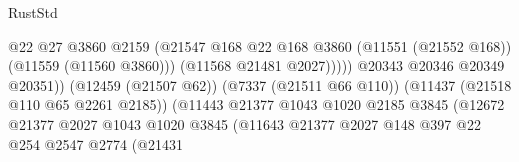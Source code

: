 \begin{lexlean}{RustStd}
\begin{coremodule}
                                                            @22
                                                            @27
                                                            @3860
                                                            @2159
                                                            (@21547
                                                              @168
                                                              @22
                                                              @168
                                                              @3860
                                                              (@11551 (@21552 @168))
                                                              (@11559 (@11560 @3860)))
                                                            (@11568 @21481 @2027)))))
                                                    @20343
                                                    @20346
                                                    @20349
                                                    @20351))
                                                (@12459 (@21507 @62))
                                                (@7337 (@21511 @66 @110))
                                                (@11437 (@21518 @110 @65 @2261 @2185))
                                                (@11443
                                                  @21377
                                                  @1043
                                                  @1020
                                                  @2185
                                                  @3845
                                                  (@12672
                                                    @21377
                                                    @2027
                                                    @1043
                                                    @1020
                                                    @3845
                                                    (@11643
                                                      @21377
                                                      @2027
                                                      @148
                                                      @397
                                                      @22
                                                      @254
                                                      @2547
                                                      @2774
                                                      (@21431

\end{coremodule}
\end{lexlean}
